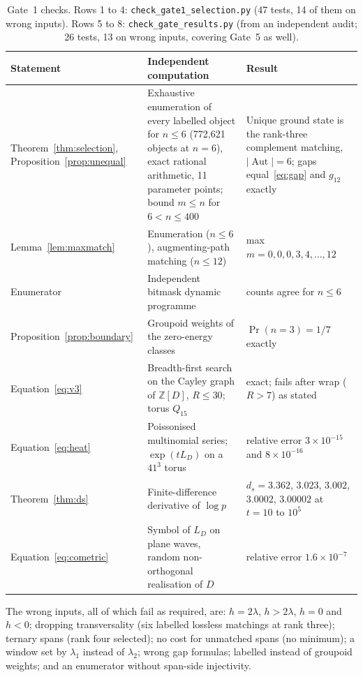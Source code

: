 \documentclass[11pt]{article}
\theoremstyle{definition}
\theoremstyle{remark}
\newcommand{\Z}{\mathbb{Z}}
\newcommand{\Aut}{\operatorname{Aut}}
\begin{document}
\begin{table}[ht]
\centering\small
\begin{tabularx}{\textwidth}{@{}Y Y Y@{}}
\toprule
Statement & Independent computation & Result \\
\midrule
Theorem~\ref{thm:selection}, Proposition~\ref{prop:unequal} &
Exhaustive enumeration of every labelled object for $n\le6$ (772{,}621 objects at
$n=6$), exact rational arithmetic, 11 parameter points; bound $m\le n$ for
$6<n\le400$ & Unique ground state is the rank-three complement matching, $|\Aut|=6$;
gaps equal~\eqref{eq:gap} and $g_{12}$ exactly \\
Lemma~\ref{lem:maxmatch} & Enumeration ($n\le6$), augmenting-path matching ($n\le12$) &
max $m=0,0,0,3,4,\dots,12$ \\
Enumerator & Independent bitmask dynamic programme & counts agree for $n\le6$ \\
Proposition~\ref{prop:boundary} & Groupoid weights of the zero-energy classes &
$\Pr(n=3)=1/7$ exactly \\
Equation~\eqref{eq:v3} & Breadth-first search on the Cayley graph of $\Z[D]$, $R\le30$;
torus $Q_{15}$ & exact; fails after wrap ($R>7$) as stated \\
Equation~\eqref{eq:heat} & Poissonised multinomial series; $\exp(tL_D)$ on a $41^3$
torus & relative error $3\times10^{-15}$ and $8\times10^{-16}$ \\
Theorem~\ref{thm:ds} & Finite-difference derivative of $\log p$ & $d_s=3.362$, $3.023$,
$3.002$, $3.0002$, $3.00002$ at $t=10$ to $10^5$ \\
Equation~\eqref{eq:cometric} & Symbol of $L_D$ on plane waves, random non-orthogonal
realisation of $D$ & relative error $1.6\times10^{-7}$ \\
\bottomrule
\end{tabularx}
\caption{Gate~1 checks. Rows 1 to 4: \texttt{check\_gate1\_selection.py} (47 tests, 14
of them on wrong inputs). Rows 5 to 8: \texttt{check\_gate\_results.py} (from an
independent audit; 26 tests, 13 on wrong inputs, covering Gate~5 as well).}
\label{tab:g1checks}
\end{table}

The wrong inputs, all of which fail as required, are: $h=2\lambda$, $h>2\lambda$, $h=0$
and $h<0$; dropping transversality (six labelled lossless matchings at rank three);
ternary spans (rank four selected); no cost for unmatched spans (no minimum); a window
set by $\lambda_1$ instead of $\lambda_2$; wrong gap formulas; labelled instead of
groupoid weights; and an enumerator without span-side injectivity.
\end{document}
